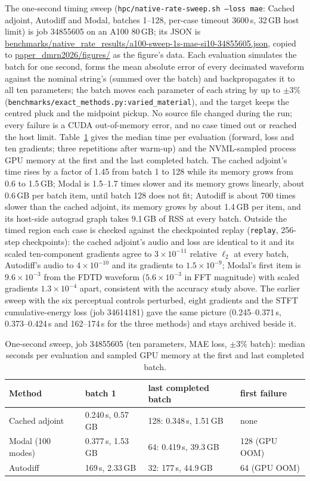 \documentclass[a4paper,10pt]{article}
\begin{document}
The one-second timing sweep (\texttt{hpc/native-rate-sweep.sh --loss mae}: Cached adjoint, Autodiff and Modal, batches 1--128, per-case timeout 3600\,s, 32\,GB host limit) is job 34855605 on an A100 80\,GB; its JSON is \url{benchmarks/native_rate_results/a100-sweep-1s-mae-si10-34855605.json}, copied to \url{paper_dmrn2026/figures/} as the figure's data. Each evaluation simulates the batch for one second, forms the mean absolute error of every decimated waveform against the nominal string's (summed over the batch) and backpropagates it to all ten parameters; the batch moves each parameter of each string by up to $\pm3\%$ (\texttt{benchmarks/exact\_methods.py:varied\_material}), and the target keeps the centred pluck and the midpoint pickup. No source file changed during the run; every failure is a CUDA out-of-memory error, and no case timed out or reached the host limit. Table~\ref{tab:sweep} gives the median time per evaluation (forward, loss and ten gradients; three repetitions after warm-up) and the NVML-sampled process GPU memory at the first and the last completed batch. The cached adjoint's time rises by a factor of 1.45 from batch 1 to 128 while its memory grows from 0.6 to 1.5\,GB; Modal is 1.5--1.7 times slower and its memory grows linearly, about 0.6\,GB per batch item, until batch 128 does not fit; Autodiff is about 700 times slower than the cached adjoint, its memory grows by about 1.4\,GB per item, and its host-side autograd graph takes 9.1\,GB of RSS at every batch. Outside the timed region each case is checked against the checkpointed replay (\texttt{replay}, 256-step checkpoints): the cached adjoint's audio and loss are identical to it and its scaled ten-component gradients agree to $3\times10^{-11}$ relative $\ell_2$ at every batch, Autodiff's audio to $4\times10^{-10}$ and its gradients to $1.5\times10^{-9}$; Modal's first item is $9.6\times10^{-3}$ from the FDTD waveform ($5.6\times10^{-3}$ in FFT magnitude) with scaled gradients $1.3\times10^{-4}$ apart, consistent with the accuracy study above. The earlier sweep with the six perceptual controls perturbed, eight gradients and the STFT cumulative-energy loss (job 34614181) gave the same picture (0.245--0.371\,s, 0.373--0.424\,s and 162--174\,s for the three methods) and stays archived beside it.

\begin{table}[ht]
\centering\small
\begin{tabular}{llll}
\hline
Method & batch 1 & last completed batch & first failure \\
\hline
Cached adjoint & 0.240\,s, 0.57\,GB & 128: 0.348\,s, 1.51\,GB & none \\
Modal (100 modes) & 0.377\,s, 1.53\,GB & 64: 0.419\,s, 39.3\,GB & 128 (GPU OOM) \\
Autodiff & 169\,s, 2.33\,GB & 32: 177\,s, 44.9\,GB & 64 (GPU OOM) \\
\hline
\end{tabular}
\caption{One-second sweep, job 34855605 (ten parameters, MAE loss, $\pm3\%$ batch): median seconds per evaluation and sampled GPU memory at the first and last completed batch.}
\label{tab:sweep}
\end{table}
\end{document}
